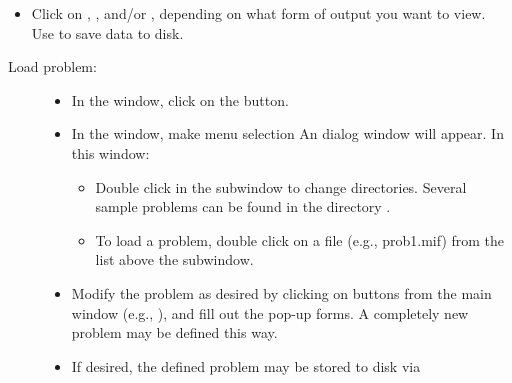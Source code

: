 \begin{list}{}{\setlength{\labelwidth}{0pt}
               \setlength{\leftmargin}{0pt}
               \setlength{\rightmargin}{\leftmargin}
               \setlength{\itemsep}{0pt}}
\begin{itemize}
\begin{itemize}
                   makes x-y plots
       \item {}
                   problem editor for  or 
       \item {}
                   2D solver interactive interface
       \item {}
                   3D solver interactive interface
    \end{itemize}
    \item Click on , , and/or
          , depending on what form of output you
          want to view.  Use  to save data to disk.
  \end{itemize}
  \item {}
    \begin{description}
    \item[Load problem:]\blankspace
    \begin{itemize}
      \item In the  window, click on the 
            button. 
      \item In the
            window, make menu selection
              An  dialog window
            will appear.  In this window:
      \begin{itemize}
        \item Double click in the  subwindow to change
              directories.  Several sample problems can be found in
              the directory .
        \item To load a problem, double click on a  file
              (e.g., prob1.mif) from the list above the 
              subwindow.
      \end{itemize}
      \item Modify the problem as desired by clicking on buttons from
            the main  window (e.g., ), and fill out the pop-up forms.  A
            completely new problem may be defined this way.
      \item If desired, the defined problem may be stored to disk via

\end{itemize}
\end{description}
\end{list}
